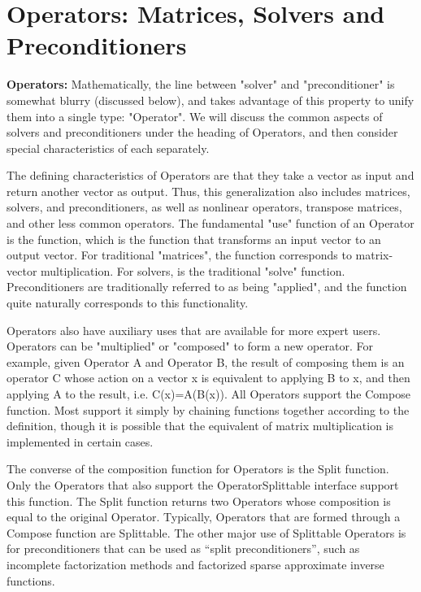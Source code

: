 
\section{Operators: Matrices, Solvers and Preconditioners}

{\bf Operators:} Mathematically, the line between "solver" and "preconditioner" is
somewhat blurry (discussed 
below), and \hypre{} takes advantage of this property
to unify them into a single type: "Operator".
We will discuss the common aspects of
solvers and preconditioners under the heading of Operators,
and then consider special characteristics of each separately.

The defining characteristics of Operators are that they take a vector as input
and return another vector as 
output. Thus, this generalization also includes matrices, solvers, and preconditioners,
as well as nonlinear
operators, transpose matrices, 
and other less common operators. 
The fundamental "use" function of an Operator is the  function, which
is the function that transforms an input vector to an output vector. 
For traditional "matrices", the  function corresponds to
matrix-vector multiplication. For 
solvers,  is the traditional "solve" function. 
Preconditioners are traditionally
referred to as being "applied", 
and the  function quite naturally corresponds to this functionality. 

Operators also have auxiliary uses that are available for more
expert users.
Operators can be "multiplied" or "composed" to form a new operator.
For example, given Operator A and Operator B, the result of composing
them is an operator C whose action on a vector x is equivalent to
applying B to x, and then applying A to the result, i.e. C(x)=A(B(x)).
All Operators support the Compose function. 
Most support it simply by chaining  functions together according
to the definition, though it is possible that the equivalent of matrix 
multiplication is implemented in certain cases.

The converse of the composition function for Operators is the Split function.
Only the Operators that also support the OperatorSplittable interface support
this function.
The Split function returns two Operators whose composition is equal to 
the original Operator.
Typically, Operators that are formed through a Compose function are Splittable.
The other major use of Splittable Operators is for preconditioners that can be 
used as ``split preconditioners'', such as incomplete factorization methods and
factorized sparse approximate inverse functions.

